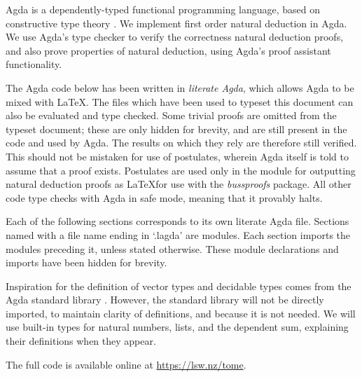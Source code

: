 Agda \citep{agdawiki} is a dependently-typed functional programming language,
based on constructive type theory \citep{norellthesis}. We implement first order
natural deduction in Agda. We use Agda's type checker to verify the correctness
natural deduction proofs, and also prove properties of natural deduction, using
Agda's proof assistant functionality.

The Agda code below has been written in \emph{literate Agda}, which allows Agda
to be mixed with \LaTeX. The files which have been used to typeset this document
can also be evaluated and type checked. Some trivial proofs are omitted from the
typeset document; these are only hidden for brevity, and are still present in
the code and used by Agda. The results on which they rely are therefore still
verified. This should not be mistaken for use of postulates, wherein Agda itself
is told to assume that a proof exists. Postulates are used only in the module
for outputting natural deduction proofs as \LaTeX for use with the
\emph{bussproofs} package. All other code type checks with Agda in safe mode,
meaning that it provably halts.

Each of the following sections corresponds to its own literate Agda file.
Sections named with a file name ending in `.lagda' are modules. Each section
imports the modules preceding it, unless stated otherwise. These module
declarations and imports have been hidden for brevity.

Inspiration for the definition of vector types and decidable types comes from
the Agda standard library \citep{agdastdlib}. However, the standard library will
not be directly imported, to maintain clarity of definitions, and because it is
not needed. We will use built-in types for natural numbers, lists, and the
dependent sum, explaining their definitions when they appear.

The full code is available online at \small{\url{https://lsw.nz/tome}}.
